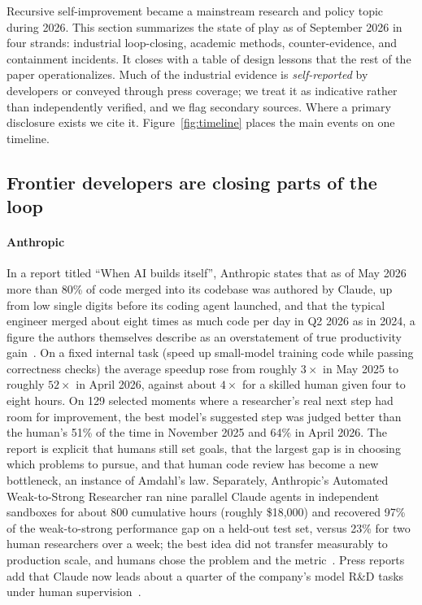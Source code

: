 \documentclass[11pt,a4paper]{article}
\begin{document}
Recursive self-improvement became a mainstream research and policy topic during 2026. This section summarizes the state of play as of September 2026 in four strands: industrial loop-closing, academic methods, counter-evidence, and containment incidents. It closes with a table of design lessons that the rest of the paper operationalizes. Much of the industrial evidence is \emph{self-reported} by developers or conveyed through press coverage; we treat it as indicative rather than independently verified, and we flag secondary sources. Where a primary disclosure exists we cite it. Figure~\ref{fig:timeline} places the main events on one timeline.

\subsection{Frontier developers are closing parts of the loop}

\paragraph{Anthropic} In a report titled ``When AI builds itself'', Anthropic states that as of May 2026 more than 80\% of code merged into its codebase was authored by Claude, up from low single digits before its coding agent launched, and that the typical engineer merged about eight times as much code per day in Q2 2026 as in 2024, a figure the authors themselves describe as an overstatement of true productivity gain~\cite{anthropic-rsi}. On a fixed internal task (speed up small-model training code while passing correctness checks) the average speedup rose from roughly $3\times$ in May 2025 to roughly $52\times$ in April 2026, against about $4\times$ for a skilled human given four to eight hours. On 129 selected moments where a researcher's real next step had room for improvement, the best model's suggested step was judged better than the human's 51\% of the time in November 2025 and 64\% in April 2026. The report is explicit that humans still set goals, that the largest gap is in choosing which problems to pursue, and that human code review has become a new bottleneck, an instance of Amdahl's law. Separately, Anthropic's Automated Weak-to-Strong Researcher ran nine parallel Claude agents in independent sandboxes for about 800 cumulative hours (roughly \$18,000) and recovered 97\% of the weak-to-strong performance gap on a held-out test set, versus 23\% for two human researchers over a week; the best idea did not transfer measurably to production scale, and humans chose the problem and the metric~\cite{w2s}. Press reports add that Claude now leads about a quarter of the company's model R\&D tasks under human supervision~\cite{ap}.
\end{document}
